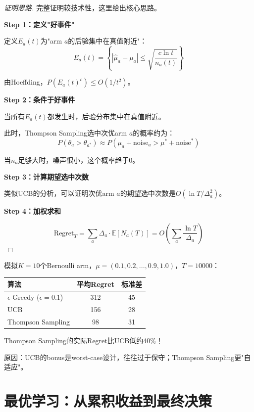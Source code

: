 \documentclass[11pt,a4paper]{article}
\theoremstyle{definition}
\begin{document}
\begin{proof}[证明思路]
完整证明较技术性，这里给出核心思路。

\textbf{Step 1：定义"好事件"}

定义$E_a(t)$为"arm $a$的后验集中在真值附近"：
\[
E_a(t) = \left\{|\hat{\mu}_a - \mu_a| \leq \sqrt{\frac{c\ln t}{n_a(t)}}\right\}
\]

由Hoeffding，$P(E_a(t)^c) \leq O(1/t^2)$。

\textbf{Step 2：条件于好事件}

当所有$E_a(t)$都发生时，后验分布集中在真值附近。

此时，Thompson Sampling选中次优arm $a$的概率约为：
\[
P(\theta_a > \theta_{a^*}) \approx P(\mu_a + \text{noise}_a > \mu^* + \text{noise}^*)
\]

当$n_a$足够大时，噪声很小，这个概率趋于0。

\textbf{Step 3：计算期望选中次数}

类似UCB的分析，可以证明次优arm $a$的期望选中次数是$O(\ln T / \Delta_a^2)$。

\textbf{Step 4：加权求和}

\[
\text{Regret}_T = \sum_a \Delta_a \cdot \mathbb{E}[N_a(T)] = O\left(\sum_a \frac{\ln T}{\Delta_a}\right)
\]
\end{proof}

\begin{calculation}
模拟$K=10$个Bernoulli arm，$\mu = (0.1, 0.2, ..., 0.9, 1.0)$，$T=10000$：

\begin{center}
\begin{tabular}{l|c|c}
\toprule
算法 & 平均Regret & 标准差 \\
\midrule
$\epsilon$-Greedy ($\epsilon=0.1$) & 312 & 45 \\
UCB & 156 & 28 \\
Thompson Sampling & 98 & 31 \\
\bottomrule
\end{tabular}
\end{center}

Thompson Sampling的实际Regret比UCB低约40\%！

原因：UCB的bonus是worst-case设计，往往过于保守；Thompson Sampling更"自适应"。
\end{calculation}

\section{最优学习：从累积收益到最终决策}
\end{document}
